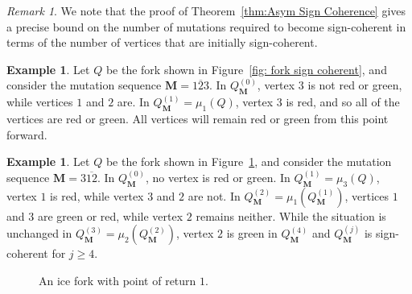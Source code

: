 \documentclass[12pt]{amsart}
\theoremstyle{definition}
\newtheorem{exmp}[thm]{Example}
\theoremstyle{remark}
\newtheorem{rem}[thm]{Remark}
\numberwithin{equation}{section}
\begin{document}
\begin{rem}
We note that the proof of Theorem~\ref{thm:Asym Sign Coherence} gives a precise bound on the number of mutations required to become sign-coherent in terms of the number of vertices that are initially sign-coherent.
\end{rem}


\begin{exmp}
Let $Q$ be the fork shown in Figure~\ref{fig: fork sign coherent}, and consider the mutation sequence $\mathbf M = \overline{123}$.
In $Q^{(0)}_{\mathbf M}$, vertex $3$ is not red or green, while vertices $1$ and $2$ are.
In $Q^{(1)}_{\mathbf M} = \mu_1(Q)$, vertex $3$ is red, and so all of the vertices are red or green. All vertices will remain red or green from this point forward.
\end{exmp}

\begin{exmp}
Let $Q$ be the fork shown in Figure~\ref{fig: another sign coherent fork}, and consider the mutation sequence $\mathbf M = 3\overline{12}$.
In $Q^{(0)}_{\mathbf M}$, no vertex is red or green.
In $Q^{(1)}_{\mathbf M} = \mu_3(Q)$, vertex $1$ is red, while vertex $3$ and $2$ are not.
In $Q^{(2)}_{\mathbf M} = \mu_1(Q^{(1)}_{\mathbf M})$, vertices $1$ and $3$ are green or red, while vertex $2$ remains neither.
While the situation is unchanged in $Q^{(3)}_{\mathbf M} = \mu_2(Q^{(2)}_{\mathbf M})$, vertex $2$ is green in $Q^{(4)}_{\mathbf M}$ and $Q^{(j)}_{\mathbf M}$ is sign-coherent for $j\geq 4$.
\end{exmp}







\begin{figure}
\centering
{}
\caption{An ice fork with point of return $1$.}
\label{fig: another sign coherent fork}
\end{figure}
\end{document}
